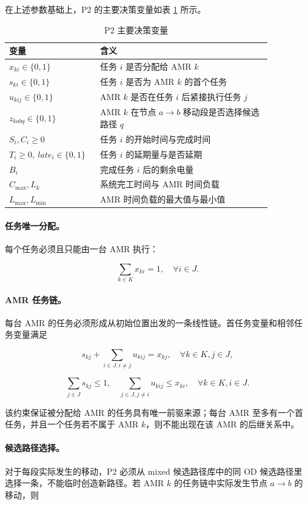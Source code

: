 在上述参数基础上，P2 的主要决策变量如表 \ref{tab:p2-variables} 所示。

\begin{table}[!htbp]
\centering
\small
\begin{tabular}{>{\raggedright\arraybackslash}p{0.26\linewidth}p{0.60\linewidth}}
\toprule
变量 & 含义 \\
\midrule
$x_{ki}\in\{0,1\}$ & 任务 $i$ 是否分配给 AMR $k$ \\
$s_{ki}\in\{0,1\}$ & 任务 $i$ 是否为 AMR $k$ 的首个任务 \\
$u_{kij}\in\{0,1\}$ & AMR $k$ 是否在任务 $i$ 后紧接执行任务 $j$ \\
$z_{kabq}\in\{0,1\}$ & AMR $k$ 在节点 $a\to b$ 移动段是否选择候选路径 $q$ \\
$S_i,C_i\ge0$ & 任务 $i$ 的开始时间与完成时间 \\
$T_i\ge0,\ late_i\in\{0,1\}$ & 任务 $i$ 的延期量与是否延期 \\
$B_i$ & 完成任务 $i$ 后的剩余电量 \\
$C_{\max},L_k$ & 系统完工时间与 AMR 时间负载 \\
$L_{\max},L_{\min}$ & AMR 时间负载的最大值与最小值 \\
\bottomrule
\end{tabular}
\caption{P2 主要决策变量}
\label{tab:p2-variables}
\end{table}

\paragraph{任务唯一分配。}
每个任务必须且只能由一台 AMR 执行：

\[
\sum_{k\in K}x_{ki}=1,\quad \forall i\in J.
\]

\paragraph{AMR 任务链。}
每台 AMR 的任务必须形成从初始位置出发的一条线性链。首任务变量和相邻任务变量满足

\[
s_{kj}+\sum_{i\in J,i\ne j}u_{kij}=x_{kj},\quad \forall k\in K,j\in J,
\]

\[
\sum_{j\in J}s_{kj}\le 1,\quad
\sum_{j\in J,j\ne i}u_{kij}\le x_{ki},\quad \forall k\in K,i\in J.
\]

该约束保证被分配给 AMR 的任务具有唯一前驱来源；每台 AMR 至多有一个首任务，并且一个任务若不属于 AMR $k$，则不能出现在该 AMR 的后继关系中。

\paragraph{候选路径选择。}
对于每段实际发生的移动，P2 必须从 mixed 候选路径库中的同 OD 候选路径里选择一条，不能临时创造新路径。若 AMR $k$ 的任务链中实际发生节点 $a\to b$ 的移动，则

